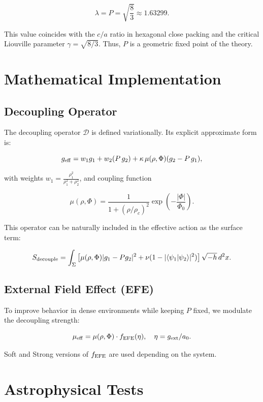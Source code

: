 \documentclass[12pt,a4paper]{article}
\begin{document}
\[
\lambda = P = \sqrt{\frac{8}{3}} \approx 1.63299.
\]

This value coincides with the \(c/a\) ratio in hexagonal close packing and the critical Liouville parameter \(\gamma = \sqrt{8/3}\). Thus, \(P\) is a geometric fixed point of the theory.

\section{Mathematical Implementation}

\subsection{Decoupling Operator}

The decoupling operator \(\mathcal{D}\) is defined variationally. Its explicit approximate form is:

\begin{equation}
g_{\rm eff} = w_1 g_1 + w_2 (P \, g_2) + \kappa \, \mu(\rho, \Phi) (g_2 - P \, g_1),
\end{equation}

with weights \( w_1 = \frac{\rho_1^2}{\rho_1^2 + \rho_2^2} \), and coupling function

\[
\mu(\rho, \Phi) = \frac{1}{1 + (\rho / \rho_c)^2} \exp\left( -\frac{|\Phi|}{\Phi_0} \right).
\]

This operator can be naturally included in the effective action as the surface term:

\[
S_{\rm decouple} = \int_{\Sigma} \left[ \mu(\rho,\Phi) |g_1 - P g_2|^2 + \nu (1 - |\langle \psi_1 | \psi_2 \rangle|^2) \right] \sqrt{-h} \, d^2x.
\]

\subsection{External Field Effect (EFE)}

To improve behavior in dense environments while keeping \(P\) fixed, we modulate the decoupling strength:

\[
\mu_{\rm eff} = \mu(\rho, \Phi) \cdot f_{\rm EFE}(\eta), \quad \eta = g_{\rm ext}/a_0.
\]

Soft and Strong versions of \(f_{\rm EFE}\) are used depending on the system.

\section{Astrophysical Tests}
\end{document}
